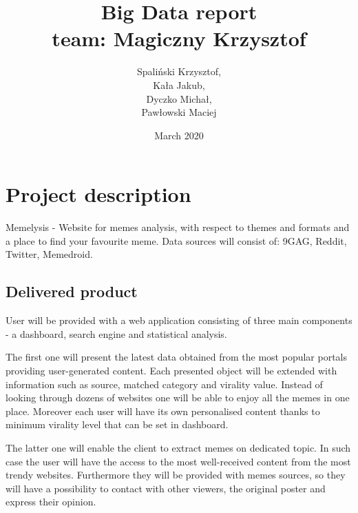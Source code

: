 \documentclass{article}
\title{\textbf{Big Data report} \\ \vspace{2em} team: Magiczny Krzysztof \\ \vspace{2em}}
\author{Spaliński Krzysztof, \\ Kała Jakub, \\ Dyczko Michał, \\ Pawłowski Maciej}
\date{\vfill March 2020}
\begin{document}
\clearpage\maketitle
\thispagestyle{empty}

\newpage

\section{Project description}



Memelysis - Website for memes analysis, with respect to themes and formats and a place to find your favourite meme. Data sources will consist of: 9GAG, Reddit, Twitter, Memedroid.


\subsection{Delivered product}

User will be provided with a web application consisting of three main components - a dashboard, search engine and statistical analysis. 

The first one will present the latest data obtained from the most popular portals providing user-generated content. Each presented object will be extended with information such as source, matched category and virality value. Instead of looking through dozens of websites one will be able to enjoy all the memes in one place. Moreover each user will have its own personalised content thanks to minimum virality level that can be set in dashboard. %

The latter one will enable the client to extract memes on dedicated topic. In such case the user will have the access to the most well-received content from the most trendy websites. Furthermore they will be provided with memes sources, so they will have a possibility to contact with other viewers, the original poster and express their opinion. 
\end{document}

